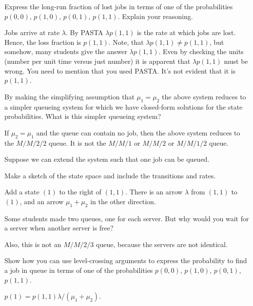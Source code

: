 \newpage

\begin{exercise}[201904]
 Express the long-run fraction of lost jobs in terms of one of the probabilities $p(0,0)$, $p(1,0)$, $p(0, 1)$, $p(1, 1)$. Explain your reasoning.
\begin{solution}
 Jobs arrive at rate $\lambda$.
 By PASTA $\lambda p(1, 1)$ is the rate at which jobs are lost.
 Hence, the loss fraction is $p(1, 1)$.
 Note, that $\lambda p(1,1) \neq p(1,1)$, but somehow, many students give the answer $\lambda p(1,1)$.
 Even by checking the units (number per unit time versus just number) it is apparent that $\lambda p(1,1)$ must be wrong.
 You need to mention that you used PASTA.
 It's not evident that it is $p(1, 1)$.
\end{solution}
\end{exercise}


\begin{exercise}[201904]
 By making the simplifying assumption that $\mu_1 = \mu_2$ the above system reduces to a simpler queueing system for which we have closed-form solutions for the state probabilities.
What is this simpler queueing system?
\begin{solution}
 If $\mu_2=\mu_1$ and the queue can contain no job, then the above system reduces to the $M/M/2/2$ queue. It is not the $M/M/1$ or $M/M/2$ or $M/M/1/2$ queue. 
\end{solution}
\end{exercise}


Suppose we can extend the system such that one job can be queued.

\begin{exercise}[201904] 
Make a sketch of the state space and include the transitions and rates. 
\begin{solution}
 Add a state $(1)$ to the right of $(1,1)$. There is an arrow $\lambda$ from $(1,1)$ to $(1)$, and an arrow $\mu_1 + \mu_2$ in the other direction.

 Some students made two queues, one for each server. But why would you wait for a server when another server is free? 

 Also, this is not an $M/M/2/3$ queue, because the servers are not identical.
\end{solution}
\end{exercise}

\begin{exercise}[201904]
 Show how you can use level-crossing arguments to express the probability to find a job in queue in terms of one of the probabilities $p(0,0)$, $p(1,0)$, $p(0, 1)$, $p(1, 1)$. 
\begin{solution}
$p(1) = p(1,1) \lambda /( \mu_1+\mu_2)$. 
\end{solution}
\end{exercise}


